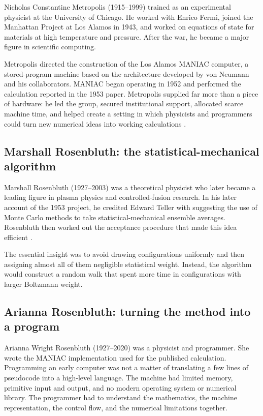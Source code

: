 \documentclass[11pt]{article}
\begin{document}
Nicholas Constantine Metropolis (1915--1999) trained as an experimental
physicist at the University of Chicago. He worked with Enrico Fermi, joined the
Manhattan Project at Los Alamos in 1943, and worked on equations of state for
materials at high temperature and pressure. After the war, he became a major
figure in scientific computing.

Metropolis directed the construction of the Los Alamos MANIAC computer, a
stored-program machine based on the architecture developed by von Neumann and
his collaborators. MANIAC began operating in 1952 and performed the calculation
reported in the 1953 paper. Metropolis supplied far more than a piece of
hardware: he led the group, secured institutional support, allocated scarce
machine time, and helped create a setting in which physicists and programmers
could turn new numerical ideas into working calculations \cite{anderson1986}.

\subsection{Marshall Rosenbluth: the statistical-mechanical algorithm}

Marshall Rosenbluth (1927--2003) was a theoretical physicist who later became a
leading figure in plasma physics and controlled-fusion research. In his later
account of the 1953 project, he credited Edward Teller with suggesting the use
of Monte Carlo methods to take statistical-mechanical ensemble averages.
Rosenbluth then worked out the acceptance procedure that made this idea
efficient \cite{gubernatis2005}.

The essential insight was to avoid drawing configurations uniformly and then
assigning almost all of them negligible statistical weight. Instead, the
algorithm would construct a random walk that spent more time in configurations
with larger Boltzmann weight.

\subsection{Arianna Rosenbluth: turning the method into a program}

Arianna Wright Rosenbluth (1927--2020) was a physicist and programmer. She
wrote the MANIAC implementation used for the published calculation. Programming
an early computer was not a matter of translating a few lines of pseudocode into
a high-level language. The machine had limited memory, primitive input and
output, and no modern operating system or numerical library. The programmer had
to understand the mathematics, the machine representation, the control flow,
and the numerical limitations together.
\end{document}
